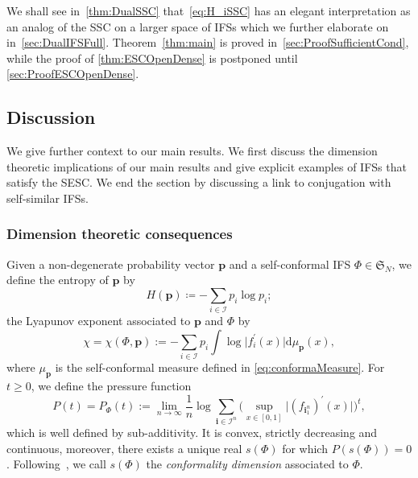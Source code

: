 \documentclass[11pt,]{article}
\def\cref#1{\ref{#1}}%
\theoremstyle{definition}
\theoremstyle{remark}
\newcommand{\0}{\mathbf{0}}
\newcommand{\bi}{\mathbf{i}}
\begin{document}
We shall see in~\cref{thm:DualSSC} that~\cref{eq:H_iSSC} has an elegant interpretation as an analog
of the SSC on a larger space of IFSs which we further elaborate on in~\cref{sec:DualIFSFull}. 
Theorem~\ref{thm:main} is proved in~\cref{sec:ProofSufficientCond}, while the proof of
\cref{thm:ESCOpenDense} is postponed until \cref{sec:ProofESCOpenDense}.

\subsection{Discussion}
We give further context to our main results. We first discuss the dimension theoretic implications
of our main results and  give explicit examples of IFSs that satisfy the SESC. We end the section by
discussing a link to conjugation with self-similar IFSs.

\subsubsection{Dimension theoretic consequences}
Given a non-degenerate probability vector $\mathbf{p}$ and a self-conformal IFS $\Phi\in
\mathfrak{S}_N$, we define the entropy of $\mathbf{p}$ by
\begin{equation*}
H(\mathbf{p})\coloneqq -\sum_{i\in\mathcal{I}} p_i\log p_i;
\end{equation*}
the Lyapunov exponent associated to $\mathbf{p}$ and $\Phi$ by
\begin{equation*}
\chi=\chi(\Phi,\mathbf{p}):=-\sum_{i \in \mathcal{I}} p_i \int \log \big|f_{i}^{'}(x)\big|
\mathrm{d} \mu_{\mathbf{p}}(x),
\end{equation*}
where $\mu_{\mathbf{p}}$ is the self-conformal measure defined in \cref{eq:conformaMeasure}.
For $t\geq 0$, we define the pressure function
\begin{equation*}
P(t)=P_{\Phi}(t):=\lim _{n \rightarrow \infty} \frac{1}{n} \log \sum_{\bi \in
\mathcal{I}^n} \Big(\sup_{x\in[0,1]} \big|(f_{\bi_1^n})^{\prime}(x)\big|\Big)^t,
\end{equation*}
which is well defined by sub-additivity. It is convex, strictly decreasing and continuous, moreover,
there exists a unique real $s(\Phi)$ for which $P(s(\Phi))=0$.
Following~\cite[Chapter~14]{BaranySimonSolomyak_Book23}, we call $s(\Phi)$ the \emph{conformality
dimension} associated to $\Phi$. 
\end{document}
